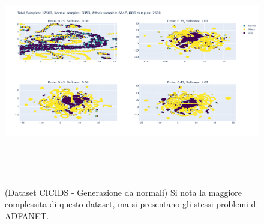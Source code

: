 



\begin{figure}[htpb]
    \centering
    \includegraphics[width=\textwidth,height=10cm,keepaspectratio=true]{img/gen_test/cicids/CICIDS18_normal_only_25p_ood.png}
    \caption{
      (Dataset CICIDS - Generazione da normali) Si nota la maggiore complessita di questo dataset, ma si presentano gli stessi problemi di ADFANET.
    }
    \label{fig:gen_CICIDS_norm_1}
\end{figure}


